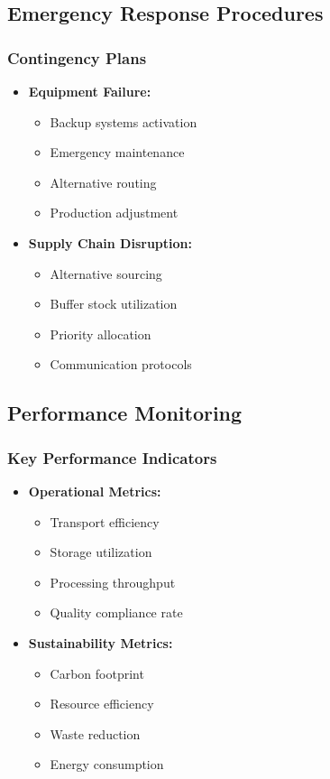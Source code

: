 \subsection{Emergency Response Procedures}

\subsubsection{Contingency Plans}
\begin{itemize}
    \item \textbf{Equipment Failure:}
    \begin{itemize}
        \item Backup systems activation
        \item Emergency maintenance
        \item Alternative routing
        \item Production adjustment
    \end{itemize}
    
    \item \textbf{Supply Chain Disruption:}
    \begin{itemize}
        \item Alternative sourcing
        \item Buffer stock utilization
        \item Priority allocation
        \item Communication protocols
    \end{itemize}
\end{itemize}

\subsection{Performance Monitoring}

\subsubsection{Key Performance Indicators}
\begin{itemize}
    \item \textbf{Operational Metrics:}
    \begin{itemize}
        \item Transport efficiency
        \item Storage utilization
        \item Processing throughput
        \item Quality compliance rate
    \end{itemize}
    
    \item \textbf{Sustainability Metrics:}
    \begin{itemize}
        \item Carbon footprint
        \item Resource efficiency
        \item Waste reduction
        \item Energy consumption
    \end{itemize}
\end{itemize}
